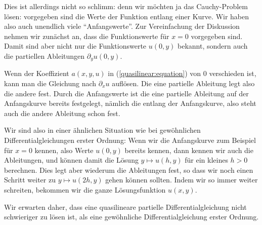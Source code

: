 Dies ist allerdings nicht so schlimm: denn wir möchten ja das Cauchy-Problem
lösen: vorgegeben sind die Werte der Funktion entlang einer Kurve.
Wir haben also auch unendlich viele ``Anfangswerte''.
Zur Vereinfachung der Diskussion nehmen wir zunächst an, dass die
Funktionswerte für $x=0$ vorgegeben sind.
Damit sind aber nicht nur die Funktionswerte $u(0,y)$ bekannt, sondern
auch die partiellen Ableitungen $\partial_yu(0,y)$.

Wenn der Koeffizient $a(x,y,u)$
in (\ref{quasilinear:equation})
von $0$ verschieden ist, kann man die Gleichung
nach $\partial_xu$ auflösen.
Die eine partielle Ableitung legt also die andere fest.
Durch die Anfangswerte ist die eine partielle Ableitung auf der
Anfangskurve bereits festgelegt, nämlich die entlang der Anfangskurve,
also steht auch die andere Ableitung schon fest.

Wir sind also in einer ähnlichen Situation wie bei gewöhnlichen
Differentialgleichungen erster Ordnung: Wenn wir die 
Anfangskurve zum Beispiel für $x=0$ kennen, also Werte
$u(0,y)$ bereits kennen, dann kennen wir
auch die Ableitungen, und können damit die Lösung
$y\mapsto u(h, y)$ für ein kleines $h>0$ berechnen. Dies legt aber
wiederum die Ableitungen fest, so dass wir noch einen Schritt 
weiter zu $y\mapsto u(2h,y)$ gehen können sollten.
Indem wir so immer weiter schreiten, bekommen wir die ganze
Lösungsfunktion $u(x,y)$.

Wir erwarten daher, dass eine quasilineare partielle Differentialgleichung
nicht schwieriger zu lösen ist, als eine gewöhnliche Differentialgleichung
erster Ordnung.

